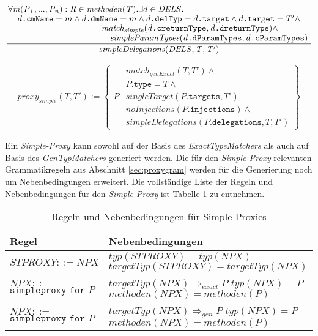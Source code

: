\documentclass[a4paper,12pt]{article}
\begin{document}
\begin{gather*}
\frac{\splitfrac{\forall \mathit{m(P_1,...,P_n):R} \in \mathit{methoden(T)}.\exists d \in \mathit{DELS}.}
{\splitfrac{d\texttt{.cmName} = m \wedge d\texttt{.dmName} = m \wedge d\texttt{.delTyp} = d\texttt{.target} \wedge d\texttt{.target} = T' \wedge}{\splitfrac{\mathit{match_{simple}(d\texttt{.creturnType}, d\texttt{.dreturnType})}\wedge }
{ \mathit{simpleParamTypes(d\texttt{.dParamTypes}, d\texttt{.cParamTypes})}}
}}}
{\mathit{simpleDelegations(DELS,T,T')}}
\end{gather*}


\begin{gather*}
proxy_{simple}(T,T') := 
\left\{\begin{array}{l|l}
		& \mathit{match_{genExact}(T,T')} \wedge \\
		& P\texttt{.type} = T \wedge \\
P		& \mathit{singleTarget(P\texttt{.targets},T')} \\
		& \mathit{noInjections(P\texttt{.injections})}  \wedge \\
		& \mathit{simpleDelegations(P\texttt{.delegations},T,T')}
\end{array}
\right\}
\end{gather*}


Ein \emph{Simple-Proxy} kann sowohl auf der Basis des \emph{ExactTypeMatchers} als auch auf Basis des \emph{GenTypMatchers} generiert werden. Die für den \emph{Simple-Proxy} relevanten Grammatikregeln aus Abschnitt \ref{sec:proxygram} werden für die Generierung noch um Nebenbedingungen erweitert. Die vollständige Liste der Regeln und Nebenbedingungen für den \emph{Simple-Proxy} ist Tabelle \ref{tab:simpleproxy} zu entnehmen.

\begin{table}[H]
\centering
\begin{tabular}{|p{4cm}|p{10cm}|}
\hline
\hline
\centering\textbf{Regel} & \textbf{Nebenbedingungen} \\
\hline
\hline
$\mathit{STPROXY} ::= NPX$ &
$\mathit{typ(STPROXY)}=\mathit{typ(NPX)}$\newline
$\mathit{targetTyp(STPROXY)} = \mathit{targetTyp(NPX)}$\\
\hline
$\mathit{NPX} ::=$ \newline $\texttt{simpleproxy } \texttt{for } P$ & 
$\mathit{targetTyp(NPX)} \Rightarrow_{exact} P $\newline
$\mathit{typ(NPX)}=P$\newline
$\mathit{methoden(NPX)} = \mathit{methoden(P)}$\\
\hline
$\mathit{NPX} ::=$ \newline $\texttt{simpleproxy } \texttt{for } P$ & 
$\mathit{targetTyp(NPX)} \Rightarrow_{gen} P $\newline
$\mathit{typ(NPX)}=P$\newline
$\mathit{methoden(NPX)} = \mathit{methoden(P)}$
\\
\hline
\hline
\end{tabular}
\caption{Regeln und Nebenbedingungen für Simple-Proxies}
 \label{tab:simpleproxy}
\end{table}
\end{document}
